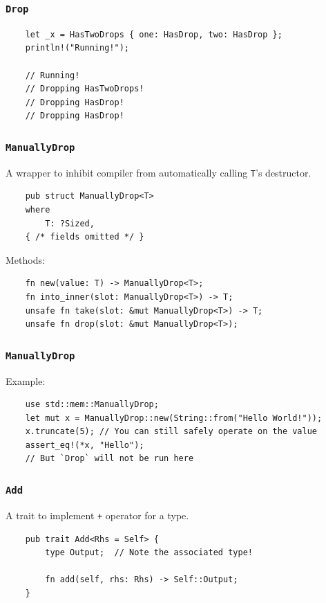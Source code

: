 \documentclass[aspectratio=1610,t]{beamer}
\begin{document}

\begin{frame}[fragile]
\frametitle{\texttt{Drop}}
\begin{verbatim}
    let _x = HasTwoDrops { one: HasDrop, two: HasDrop };
    println!("Running!");

    // Running!
    // Dropping HasTwoDrops!
    // Dropping HasDrop!
    // Dropping HasDrop!
\end{verbatim}
\end{frame}


\begin{frame}[fragile]
\frametitle{\texttt{ManuallyDrop}}
A wrapper to inhibit compiler from automatically calling \texttt{T}’s destructor.

\begin{verbatim}
    pub struct ManuallyDrop<T> 
    where
        T: ?Sized, 
    { /* fields omitted */ }
\end{verbatim}

Methods:
\begin{verbatim}
    fn new(value: T) -> ManuallyDrop<T>;
    fn into_inner(slot: ManuallyDrop<T>) -> T;
    unsafe fn take(slot: &mut ManuallyDrop<T>) -> T;
    unsafe fn drop(slot: &mut ManuallyDrop<T>);
\end{verbatim}
\end{frame}


\begin{frame}[fragile]
\frametitle{\texttt{ManuallyDrop}}
Example:
\begin{verbatim}
    use std::mem::ManuallyDrop;
    let mut x = ManuallyDrop::new(String::from("Hello World!"));
    x.truncate(5); // You can still safely operate on the value
    assert_eq!(*x, "Hello");
    // But `Drop` will not be run here
\end{verbatim}
\end{frame}


\begin{frame}[fragile]
\frametitle{\texttt{Add}}
A trait to implement \texttt{+} operator for a type.

\begin{verbatim}
    pub trait Add<Rhs = Self> {
        type Output;  // Note the associated type!

        fn add(self, rhs: Rhs) -> Self::Output;
    }
\end{verbatim}
\end{frame}
\end{document}
